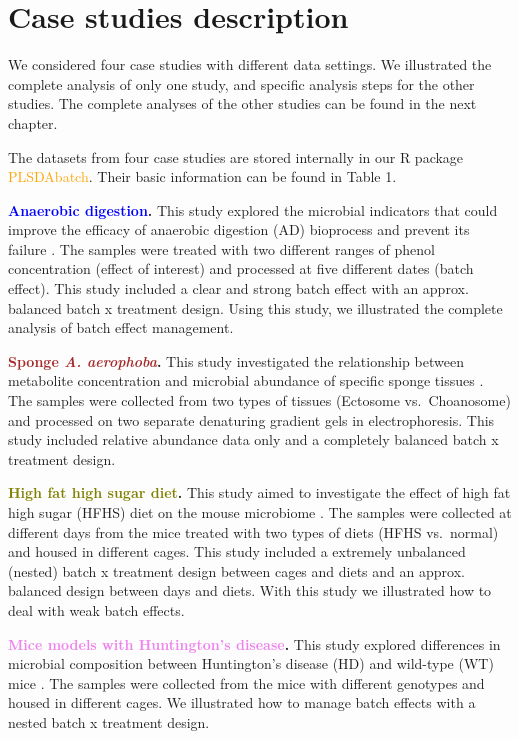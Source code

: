 \documentclass[
]{book}
\begin{document}
\hypertarget{case-studies-description}{%
\section{Case studies description}\label{case-studies-description}}

We considered four case studies with different data settings. We illustrated the complete analysis of only one study, and specific analysis steps for the other studies. The complete analyses of the other studies can be found in the next chapter.

The datasets from four case studies are stored internally in our R package \textcolor{orange}{PLSDAbatch}. Their basic information can be found in Table 1.

\textbf{\textcolor{blue}{Anaerobic digestion}.} This study explored the microbial indicators that could improve the efficacy of anaerobic digestion (AD) bioprocess and prevent its failure \citep{chapleur2016increasing}. The samples were treated with two different ranges of phenol concentration (effect of interest) and processed at five different dates (batch effect). This study included a clear and strong batch effect with an approx. balanced batch x treatment design. Using this study, we illustrated the complete analysis of batch effect management.

\textbf{\textcolor{brown}{Sponge} \emph{\textcolor{brown}{A. aerophoba}}.} This study investigated the relationship between metabolite concentration and microbial abundance of specific sponge tissues \citep{sacristan2011exploring}. The samples were collected from two types of tissues (Ectosome vs.~Choanosome) and processed on two separate denaturing gradient gels in electrophoresis. This study included relative abundance data only and a completely balanced batch x treatment design.

\textbf{\textcolor{olive}{High fat high sugar diet}.} This study aimed to investigate the effect of high fat high sugar (HFHS) diet on the mouse microbiome \citep{susin2020variable}. The samples were collected at different days from the mice treated with two types of diets (HFHS vs.~normal) and housed in different cages. This study included a extremely unbalanced (nested) batch x treatment design between cages and diets and an approx. balanced design between days and diets. With this study we illustrated how to deal with weak batch effects.

\textbf{\textcolor{violet}{Mice models with Huntington’s disease}.} This study explored differences in microbial composition between Huntington's disease (HD) and wild-type (WT) mice \citep{kong2020microbiome}. The samples were collected from the mice with different genotypes and housed in different cages. We illustrated how to manage batch effects with a nested batch x treatment design.
\end{document}

